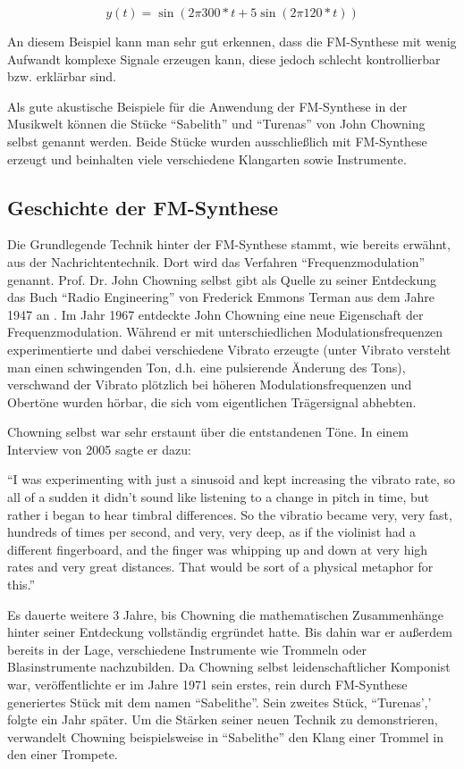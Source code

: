 \[
y(t) = \sin(2 \pi 300*t + 5 \sin(2 \pi 120*t))
\]

An diesem Beispiel kann man sehr gut erkennen, dass die FM-Synthese mit wenig Aufwandt komplexe Signale erzeugen kann, diese jedoch schlecht kontrollierbar bzw. erklärbar sind.

Als gute akustische Beispiele für die Anwendung der FM-Synthese in der Musikwelt können die Stücke ``Sabelith'' und ``Turenas'' von John Chowning selbst genannt werden. Beide Stücke wurden ausschließlich mit FM-Synthese erzeugt und beinhalten viele verschiedene Klangarten sowie Instrumente.

\subsection{Geschichte der FM-Synthese}
Die Grundlegende Technik hinter der FM-Synthese stammt, wie bereits erwähnt, aus der Nachrichtentechnik. Dort wird das Verfahren ``Frequenzmodulation'' genannt. Prof. Dr. John Chowning selbst gibt als Quelle zu seiner Entdeckung das Buch ``Radio Engineering'' von Frederick Emmons Terman aus dem Jahre 1947 an \cite[s. xy]{soundofinnovation}. Im Jahr 1967 entdeckte John Chowning eine neue Eigenschaft der Frequenzmodulation. Während er mit unterschiedlichen Modulationsfrequenzen experimentierte und dabei verschiedene Vibrato erzeugte (unter Vibrato versteht man einen schwingenden Ton, d.h. eine pulsierende Änderung des Tons), verschwand der Vibrato plötzlich bei höheren Modulationsfrequenzen und Obertöne wurden hörbar, die sich vom eigentlichen Trägersignal abhebten.\cite{fatherofdigitalmusik}

Chowning selbst war sehr erstaunt über die entstandenen Töne. In einem Interview von 2005 sagte er dazu: 

``I was experimenting with just a sinusoid and kept increasing the vibrato rate, so all of a sudden it didn't sound like listening to a change in pitch in time, but rather i began to hear timbral differences. So the vibratio became very, very fast, hundreds of times per second, and very, very deep, as if the violinist had a different fingerboard, and the finger was whipping up and down at very high rates and very great distances. That would be sort of a physical metaphor for this.''\cite[s. xy]{soundofinnovation}

Es dauerte weitere 3 Jahre, bis Chowning die mathematischen Zusammenhänge hinter seiner Entdeckung vollständig ergründet hatte. Bis dahin war er außerdem bereits in der Lage, verschiedene Instrumente wie Trommeln oder Blasinstrumente nachzubilden. Da Chowning selbst leidenschaftlicher Komponist war, veröffentlichte er im Jahre 1971 sein erstes, rein durch FM-Synthese generiertes Stück mit dem namen ``Sabelithe''. Sein zweites Stück, ``Turenas',' folgte ein Jahr später.
Um die Stärken seiner neuen Technik zu demonstrieren, verwandelt Chowning beispielsweise in ``Sabelithe'' den Klang einer Trommel in den einer Trompete.\cite[s. xy]{soundofinnovation}
 
